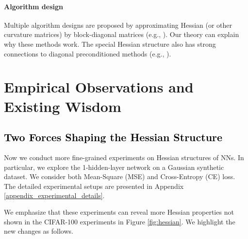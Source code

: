 \documentclass{article}
\newcommand{\1}{^{(1)}}
\newcommand{\2}{^{(2)}}
\newcommand{\yushunrevise}[1]{\textcolor{black}{ #1}}
\begin{document}
\paragraph{Algorithm design} Multiple algorithm designs are proposed by approximating Hessian (or other curvature matrices) by block-diagonal matrices (e.g., \citep{roux2007topmoumoute,martens2015optimizing,desjardins2015natural,zhang2017block,gupta2018shampoo,george2018fast,goldfarb2020practical,dangel2020modular,vyas2024soap,jordan2024muon,an2025asgo}). Our theory can explain why these methods work. The special Hessian structure also has strong connections to diagonal preconditioned methods (e.g., \citep{kingma2014adam,liu2023sophia}).


\section{Empirical Observations and Existing Wisdom}
\subsection{\yushunrevise{Two Forces Shaping the Hessian Structure}}
\label{sec_closer_look}
Now we conduct more fine-grained experiments on Hessian structures of NNs. In particular, we explore the 1-hidden-layer network on a Gaussian synthetic dataset. We consider both Mean-Square (MSE) and Cross-Entropy (CE) loss. The detailed experimental setups are presented in Appendix \ref{appendix_experimental_details}. 

We emphasize that these experiments can reveal more Hessian properties not shown in the CIFAR-100 experiments in Figure \ref{fig:hessian}. We highlight the new changes as follows. 
\end{document}
